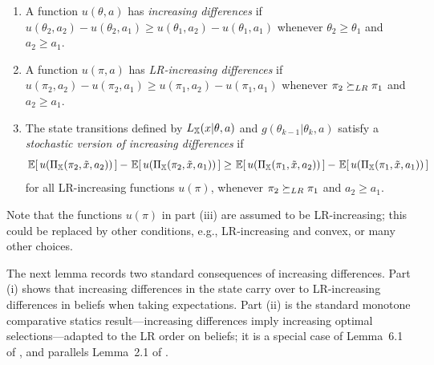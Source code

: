 \begin{definition}\label{def:incdiff}\quad
\begin{enumerate}
\item A function $u(\theta,a)$ has \emph{increasing differences} if
  $u(\theta_2,a_2)-u(\theta_2,a_1) \geq u(\theta_1,a_2)-u(\theta_1,a_1)$
  whenever $\theta_2 \geq \theta_1$ and $a_2 \geq a_1$.
\item A function $u(\pi,a)$ has \emph{LR-increasing differences} if
  $u(\pi_2,a_2)-u(\pi_2,a_1) \geq u(\pi_1,a_2)-u(\pi_1,a_1)$ whenever
  $\pi_2 \succeq_{LR} \pi_1$ and $a_2 \geq a_1$.
\item The state transitions defined by $L_{\mathbb{X}}(x|\theta,a)$ and
  $g(\theta_{k-1}|\theta_k,a)$ satisfy a \emph{stochastic version of
  increasing differences} if
  \begin{equation}
  \ev{u(\Pi_\iX(\pi_2,\tilde{x},a_2))}-\ev{u(\Pi_\iX(\pi_2,\tilde{x},a_1))}
  \geq
  \ev{u(\Pi_\iX(\pi_1,\tilde{x},a_2))}-\ev{u(\Pi_\iX(\pi_1,\tilde{x},a_1))}
  \label{eq:stochincdiff}
  \end{equation}
  for all LR-increasing functions $u(\pi)$, whenever $\pi_2 \succeq_{LR} \pi_1$
  and $a_2 \geq a_1$.
\end{enumerate}
\end{definition}

Note that the functions $u(\pi)$ in part (iii) are assumed to be
LR-increasing; this could be replaced by other conditions, e.g.,
LR-increasing and convex, or many other choices.

The next lemma records two standard consequences of increasing
differences. Part (i) shows that increasing differences in the state
carry over to LR-increasing differences in beliefs when taking
expectations. Part (ii) is the standard monotone comparative statics
result---increasing differences imply increasing optimal
selections---adapted to the LR order on beliefs; it is a special case
of Lemma~6.1 of \citet{topkis1978minimizing}, and parallels Lemma~2.1
of \citet{lovejoy1987some}. 

